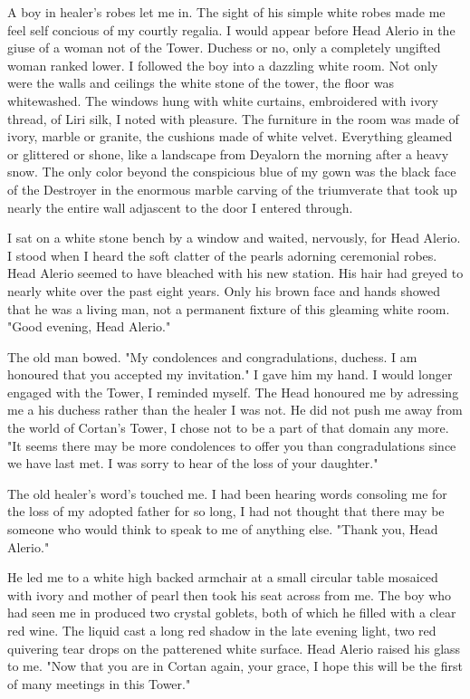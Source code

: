 \documentclass{article}
\begin{document}
A boy in healer's robes let me in. The sight of his simple white robes made me feel self concious of my courtly regalia. I would appear before Head Alerio in the giuse of  a woman not of the Tower. Duchess or no, only a completely ungifted woman ranked lower. I followed the boy into a dazzling white room. Not only were the walls and ceilings the white stone of the tower, the floor was whitewashed. The windows hung with white curtains, embroidered with ivory thread, of Liri silk, I noted with pleasure. The furniture in the room was made of ivory, marble or granite, the cushions made of white velvet. Everything gleamed or glittered or shone, like a landscape from Deyalorn the morning after a heavy snow. The only color beyond the conspicious blue of my gown was the black face of the Destroyer in the enormous marble carving of the triumverate that took up nearly the entire wall adjascent to the door I entered through. 

I sat on a white stone bench by a window and waited, nervously, for Head Alerio. I stood when I heard the soft clatter of the pearls adorning ceremonial robes. Head Alerio seemed to have bleached with his new station. His hair had greyed to nearly white over the past eight years. Only his brown face and hands showed that he was a living man, not a permanent fixture of this gleaming white room. "Good evening, Head Alerio."

The old man bowed. "My condolences and congradulations, duchess. I am honoured that you accepted my invitation." I gave him my hand. I would longer engaged with the Tower, I reminded myself. The Head honoured me by adressing me a his duchess rather than the healer I was not. He did not push me away from the world of Cortan's Tower, I chose not to be a part of that domain any more. "It seems there may be more condolences to offer you than congradulations since we have last met. I was sorry to hear of the loss of your daughter."

The old healer's word's touched me. I had been hearing words consoling me for the loss of my adopted father for so long, I had not thought that there may be someone who would think to speak to me of anything else. "Thank you, Head Alerio."

He led me to a white high backed armchair at a small circular table mosaiced with ivory and mother of pearl then took his seat across from me. The boy who had seen me in produced two crystal goblets, both of which he filled with a clear red wine. The liquid cast a long red shadow in the late evening light, two red quivering tear drops on the patterened white surface. Head Alerio raised his glass to me. "Now that you are in Cortan again, your grace, I hope this will be the first of many meetings in this Tower."
\end{document}
